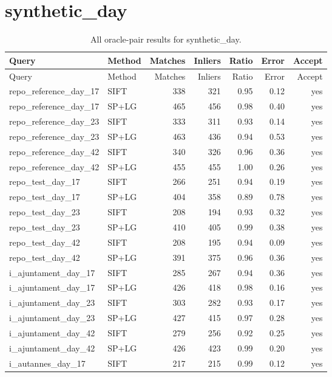 \section{synthetic\_day}
\begingroup\scriptsize\setlength{\tabcolsep}{3pt}
\begin{longtable}{llrrrrr}
\caption{All oracle-pair results for synthetic\_day.}\\
\toprule
Query & Method & Matches & Inliers & Ratio & Error & Accept\\\midrule\endfirsthead
\toprule Query & Method & Matches & Inliers & Ratio & Error & Accept\\\midrule\endhead
\bottomrule\endfoot
repo\_reference\_day\_17 & SIFT & 338 & 321 & 0.95 & 0.12 & yes \\
repo\_reference\_day\_17 & SP+LG & 465 & 456 & 0.98 & 0.40 & yes \\
repo\_reference\_day\_23 & SIFT & 333 & 311 & 0.93 & 0.14 & yes \\
repo\_reference\_day\_23 & SP+LG & 463 & 436 & 0.94 & 0.53 & yes \\
repo\_reference\_day\_42 & SIFT & 340 & 326 & 0.96 & 0.36 & yes \\
repo\_reference\_day\_42 & SP+LG & 455 & 455 & 1.00 & 0.26 & yes \\
repo\_test\_day\_17 & SIFT & 266 & 251 & 0.94 & 0.19 & yes \\
repo\_test\_day\_17 & SP+LG & 404 & 358 & 0.89 & 0.78 & yes \\
repo\_test\_day\_23 & SIFT & 208 & 194 & 0.93 & 0.32 & yes \\
repo\_test\_day\_23 & SP+LG & 410 & 405 & 0.99 & 0.38 & yes \\
repo\_test\_day\_42 & SIFT & 208 & 195 & 0.94 & 0.09 & yes \\
repo\_test\_day\_42 & SP+LG & 391 & 375 & 0.96 & 0.36 & yes \\
i\_ajuntament\_day\_17 & SIFT & 285 & 267 & 0.94 & 0.36 & yes \\
i\_ajuntament\_day\_17 & SP+LG & 426 & 418 & 0.98 & 0.16 & yes \\
i\_ajuntament\_day\_23 & SIFT & 303 & 282 & 0.93 & 0.17 & yes \\
i\_ajuntament\_day\_23 & SP+LG & 427 & 415 & 0.97 & 0.28 & yes \\
i\_ajuntament\_day\_42 & SIFT & 279 & 256 & 0.92 & 0.25 & yes \\
i\_ajuntament\_day\_42 & SP+LG & 426 & 423 & 0.99 & 0.20 & yes \\
i\_autannes\_day\_17 & SIFT & 217 & 215 & 0.99 & 0.12 & yes \\

\end{longtable}

